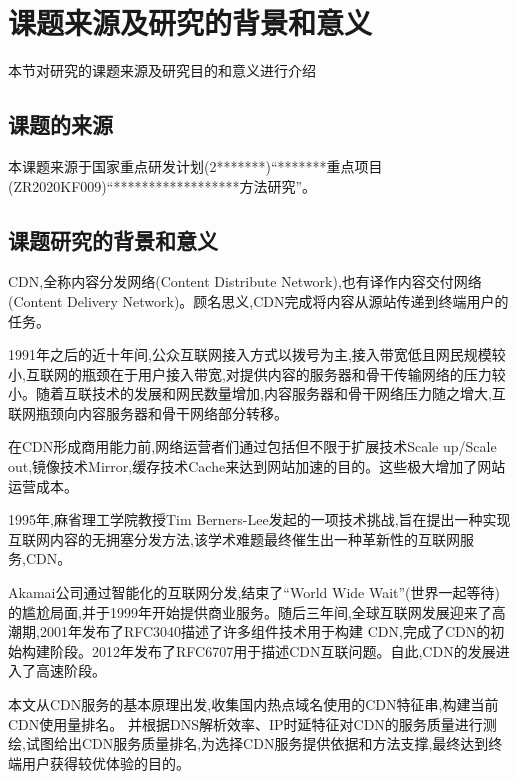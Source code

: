 
\section{课题来源及研究的背景和意义}
	本节对研究的课题来源及研究目的和意义进行介绍
\subsection{课题的来源}
本课题来源于国家重点研发计划(2*******)“*******重点项目(ZR2020KF009)“******************方法研究”。
\subsection{课题研究的背景和意义}



CDN,全称内容分发网络(Content Distribute Network),也有译作内容交付网络(Content Delivery Network)。顾名思义,CDN完成将内容从源站传递到终端用户的任务。


1991年之后的近十年间,公众互联网接入方式以拨号为主,接入带宽低且网民规模较小,互联网的瓶颈在于用户接入带宽,对提供内容的服务器和骨干传输网络的压力较小。随着互联技术的发展和网民数量增加,内容服务器和骨干网络压力随之增大,互联网瓶颈向内容服务器和骨干网络部分转移。

在CDN形成商用能力前,网络运营者们通过包括但不限于扩展技术Scale up/Scale out,镜像技术Mirror,缓存技术Cache来达到网站加速的目的。这些极大增加了网站运营成本。

1995年,麻省理工学院教授Tim Berners-Lee发起的一项技术挑战,旨在提出一种实现互联网内容的无拥塞分发方法,该学术难题最终催生出一种革新性的互联网服务,CDN。

Akamai公司通过智能化的互联网分发,结束了“World Wide Wait”(世界一起等待)的尴尬局面,并于1999年开始提供商业服务。随后三年间,全球互联网发展迎来了高潮期,2001年发布了RFC3040\cite{RFC-3040}描述了许多组件技术用于构建 CDN,完成了CDN的初始构建阶段。2012年发布了RFC6707\cite{RFC-6707}用于描述CDN互联问题。自此,CDN的发展进入了高速阶段。 



本文从CDN服务的基本原理出发,收集国内热点域名使用的CDN特征串,构建当前CDN使用量排名。
并根据DNS解析效率、IP时延特征对CDN的服务质量进行测绘,试图给出CDN服务质量排名,为选择CDN服务提供依据和方法支撑,最终达到终端用户获得较优体验的目的。





